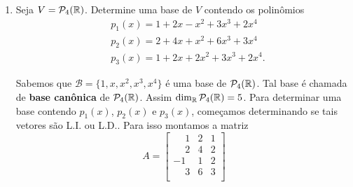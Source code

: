 \begin{exemplo}
\begin{enumerate}[label={\arabic*})]
\begin{solucao}
\[\begin{bmatrix}
				\overline{0}\\
				\overline{0}\\
				\overline{0}\\
				\overline{1}\\
				\overline{0}
			\end{bmatrix}, e_5 = \begin{bmatrix}
				\overline{0}\\
				\overline{0}\\
				\overline{0}\\
				\overline{0}\\
				\overline{1}
			\end{bmatrix}\right\},
		\]
		da{\'\i} $\dim_{\z_7}\cp{M}_{5\times1}(\z_7) = 5$. Assim como $S$ possui 5 elementos, basta mostrar que $S$ \'e L.I.. O que \'e imediato pois
		\[
			a_1e_1 + a_2e_2 + a_3e_3 + a_4e_4 + a_5e_5 = \begin{bmatrix}
				\overline{0}\\
				\overline{0}\\
				\overline{0}\\
				\overline{0}\\
				\overline{0}
			\end{bmatrix}
		\]
		s\'o \'e poss{\'\i}vel se $a_1 = a_2 = a_3 = a_4 = a_5 = \overline{0}$.
		\end{solucao}
		\item Seja $V = \mathcal{P}_4(\mathbb{R})$. Determine uma base de $V$ contendo os polin\^omios
		\begin{align*}
			&p_1(x) = 1 + 2x - x^2 + 3x^3 + 2x^4\\
			&p_2(x) = 2 + 4x + x^2 + 6x^3 + 3x^4\\
			&p_3(x) = 1 + 2x + 2x^2 + 3x^3 + 2x^4.
		\end{align*}
		\begin{solucao}
			Sabemos que $\mathcal{B} = \{1,x,x^2,x^3,x^4\}$ \'e uma base de $\mathcal{P}_4(\mathbb{R})$. Tal base \'e chamada de \textbf{base can\^onica} de $\mathcal{P}_4(\mathbb{R})$. Assim $\dim_{\mathbb{R}} \mathcal{P}_4(\mathbb{R}) = 5$. Para determinar uma base contendo $p_1(x)$, $p_2(x)$ e $p_3(x)$, come\c{c}amos determinando se tais vetores s\~ao L.I. ou L.D.. Para isso montamos a matriz
			\[
				A = \begin{bmatrix}
					\phantom{-}1 & 2 & 1\\
					\phantom{-}2 & 4 & 2\\
					-1 & 1 & 2\\
					\phantom{-}3 & 6 & 3\\

\end{bmatrix}\]
\end{solucao}
\end{enumerate}
\end{exemplo}
